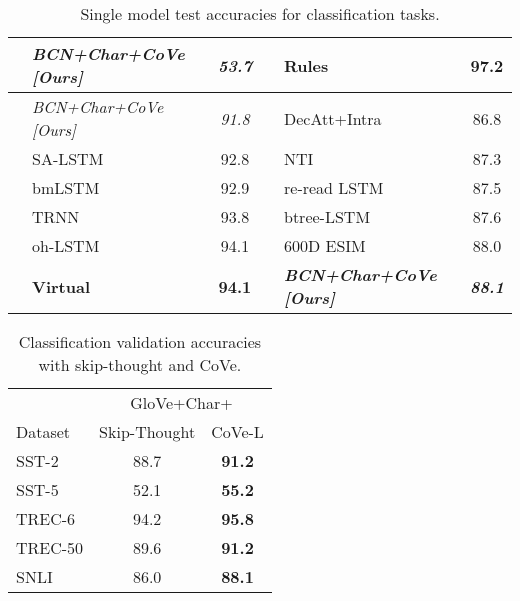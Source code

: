 \documentclass{article}
\begin{document}
\begin{table}
\begin{tabular}{llcllc}
                        & {\it \textbf{BCN+Char+CoVe [Ours]} }           & {\it \textbf{53.7}} &                         &  \textbf{Rules~\citep{Madabushi2016HighAR}}                   & \textbf{97.2}             \\
\midrule
 \parbox[t]{2mm}{}  & {\it BCN+Char+CoVe [Ours]}                     &{\it91.8}          & \parbox[t]{2mm}{}   &DecAtt+Intra~\citep{Parikh2016ADA} &86.8             \\
                        & SA-LSTM~\citep{Dai2015SemisupervisedSL} &92.8             &                         & NTI~\citep{Munkhdalai2016NeuralTI} & 87.3             \\
                        & bmLSTM~\citep{Radford2017LearningTG} &92.9             &                        & re-read LSTM~\citep{Sha2016ReadingAT} & 87.5             \\
                        & TRNN~\citep{Dieng2016TopicRNNAR} &93.8             &                        & btree-LSTM~\citep{Paria2016ANA} & 87.6            \\
               & oh-LSTM~\citep{Johnson2016SupervisedAS} &94.1             &                         & 600D ESIM~\citep{Chen2016EnhancingAC} &  88.0             \\
                        & {\bf Virtual~\citep{Miyato2017AdversarialTM}} &{\bf94.1}            &                         & {\it \textbf{BCN+Char+CoVe [Ours]}}            & {\it\textbf{88.1}} \\
\bottomrule
  \end{tabular}
      \caption{Single model test accuracies for classification tasks.}
  \label{testPerf}
  \vspace{-4mm}
\end{table}

\begin{wraptable}{r}{6cm}
  \vspace{-3.5mm}
\captionsetup{width=5.6cm}
  \centering
\begin{tabular}{lcc}
\toprule
        & \multicolumn{2}{c}{GloVe+Char+} \\
\cmidrule(lr){2-3}
Dataset & Skip-Thought & CoVe-L \\
\midrule
SST-2   & 88.7 & \textbf{91.2}\\ 
SST-5   & 52.1 & \textbf{55.2}\\
TREC-6  & 94.2 & \textbf{95.8}\\ 
TREC-50 & 89.6 & \textbf{91.2}\\
SNLI    & 86.0 &  \textbf{88.1}\\
\bottomrule
  \end{tabular}
      \caption{Classification validation accuracies with skip-thought and CoVe.}
  \label{SkipTable}
\end{wraptable}
\end{document}
